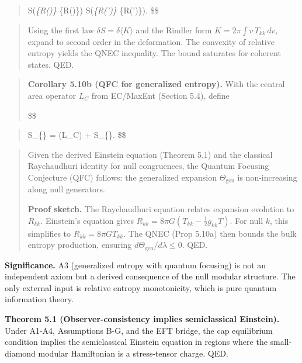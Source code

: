 \documentclass[11pt,a4paper]{article}
\theoremstyle{remark}
\begin{document}
\begin{quote}
S(\rho\emph{\{R(\lambda)\} \textbar{} \omega}\{R(\lambda)\}) \le S(\rho\emph{\{R(\lambda')\} \textbar{} \omega}\{R(\lambda')\}).
\$\$
\end{quote}

\begin{quote}
Using the first law \(\delta S = \delta \langle K \rangle\) and the Rindler form
\(K = 2\pi \int v \, T_{kk} \, dv\), expand to second order in the deformation.
The convexity of relative entropy yields the QNEC inequality. The bound
saturates for coherent states. QED.
\end{quote}

\begin{quote}
\textbf{Corollary 5.10b (QFC for generalized entropy).} With the central area
operator \(L_C\) from EC/MaxEnt (Section 5.4), define

\$\$
\end{quote}

\begin{quote}
S\_\{\} = (\rho L\_C) + S\_\{\}.
\$\$
\end{quote}

\begin{quote}
Given the derived Einstein equation (Theorem 5.1) and the classical
Raychaudhuri identity for null congruences, the Quantum Focusing Conjecture
(QFC) follows: the generalized expansion \(\Theta_{\mathrm{gen}}\) is
non-increasing along null generators.

\textbf{Proof sketch.} The Raychaudhuri equation relates expansion evolution to
\(R_{kk}\). Einstein's equation gives \(R_{kk} = 8\pi G (T_{kk} - \frac{1}{2}g_{kk}T)\).
For null \(k\), this simplifies to \(R_{kk} = 8\pi G T_{kk}\). The QNEC
(Prop 5.10a) then bounds the bulk entropy production, ensuring
\(d\Theta_{\mathrm{gen}}/d\lambda \le 0\). QED.
\end{quote}

\textbf{Significance.} A3 (generalized entropy with
quantum focusing) is not an independent axiom but a derived consequence
of the null modular structure. The only external input is relative entropy
monotonicity, which is pure quantum information theory.

\textbf{Theorem 5.1 (Observer-consistency implies semiclassical Einstein).} Under
A1-A4, Assumptions B-G, and the EFT bridge, the cap equilibrium condition
implies the semiclassical Einstein equation in regions where the
small-diamond modular Hamiltonian is a stress-tensor charge. QED.
\end{document}
